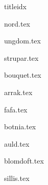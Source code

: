 \documentclass[a6paper,8pt,makeidx]{book}
\begin{document}
\begin{songs}{titleidx}

\addtocounter{songnum}{1}

{nord.tex}
\clearpage

{ungdom.tex}
\clearpage

{strupar.tex}	
\clearpage

{bouquet.tex}	
\clearpage

{arrak.tex}	
\clearpage

{fafa.tex}	
\clearpage

{botnia.tex}	
\clearpage

{auld.tex}	
\clearpage

{blomdoft.tex}
\clearpage

{sillis.tex}
\clearpage

\end{songs}

\renewcommand{\idxtitlefont}{\rmfamily\mdseries}
\renewcommand{\idxlyricfont}{\rmfamily\mdseries}
\renewcommand{\idxheadfont}{\sffamily\it\large}
\setlength{\idxheadwidth}{0.5cm}
\end{document}
